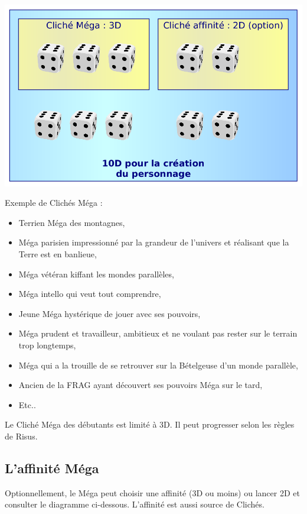 \documentclass[11pt]{article}
\begin{document}
\begin{center}
\includegraphics[scale=0.34]{01-creation-perso}
\end{center}

Exemple de Clichés Méga :
\begin{itemize}
\item Terrien Méga des montagnes,
\item Méga parisien impressionné par la grandeur de l'univers et réalisant que la Terre est en banlieue,
\item Méga vétéran kiffant les mondes parallèles,
\item Méga intello qui veut tout comprendre,
\item Jeune Méga hystérique de jouer avec ses pouvoirs,
\item Méga prudent et travailleur, ambitieux et ne voulant pas rester sur le terrain trop longtemps,
\item Méga qui a la trouille de se retrouver sur la Bételgeuse d'un monde parallèle,
\item Ancien de la FRAG ayant découvert ses pouvoirs Méga sur le tard,
\item Etc.. 
\end{itemize}

Le Cliché Méga des débutants est limité à 3D. Il peut progresser selon les règles de Risus.

\newpage
\subsection{L'affinité Méga}

Optionnellement, le Méga peut choisir une affinité (3D ou moins) ou lancer 2D et consulter le diagramme ci-dessous. L'affinité est aussi source de Clichés.
\end{document}
